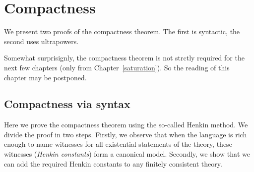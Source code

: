 \documentclass[creche.tex]{subfiles}
\begin{document}
\chapter{Compactness}
\label{compactness}

\def\medrel#1{\parbox[t]{6ex}{$\displaystyle\hfil #1$}}
\def\ceq#1#2#3{\parbox{20ex}{$\displaystyle #1$}\medrel{#2}$\displaystyle  #3$}

We present two proofs of the compactness theorem. The first is syntactic, the second uses ultrapowers.

Somewhat surprisignly, the compactness theorem is not strctly required for the next few chapters (only from Chapter~\ref{saturation}). So the reading of this chapter may be postponed.

\section{Compactness via syntax}

Here we prove the compactness theorem using the so-called Henkin method. We divide the proof in two steps. Firstly, we observe that when the language is rich enough to name witnesses for all existential statements of the theory, these witnesses (\textit{Henkin constants\/}) form a canonical model. Secondly, we show that we can add the required Henkin constants to any finitely consistent theory.
\end{document}
